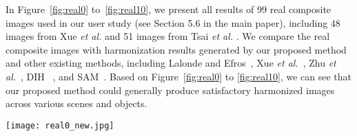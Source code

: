 \documentclass[10pt,twocolumn,letterpaper]{article}
\begin{document}
In Figure~\ref{fig:real0} to~\ref{fig:real10}, we present all results of 99 real composite images used in our user study (see Section 5.6 in the main paper), including 48 images from Xue \textit{et al.} \cite{xue2012understandingsupp} and 51 images from Tsai \textit{et al.} \cite{tsai2017deepsupp}. We compare the real composite images with harmonization results generated by our proposed method and other existing methods, including Lalonde and Efros~\cite{lalonde2007usingsupp}, Xue \textit{et al.}~\cite{xue2012understandingsupp}, Zhu \textit{et al.}~\cite{zhu2015learningsupp}, DIH ~\cite{tsai2017deepsupp}, and SAM~\cite{xiaodong2019improvingsupp}. Based on Figure~\ref{fig:real0} to \ref{fig:real10}, we can see that our proposed method could generally produce satisfactory harmonized images across various scenes and objects.


\vspace{25pt}
\begin{figure*}[hb]
\begin{center}
\texttt{[image: real0\_new.jpg]}
\end{center}
   \caption{Results on real composite images, including the input composite, five state-of-the-art methods, and our proposed DoveNet.}
\label{fig:real0}
\end{figure*}

\pagebreak
\end{document}
